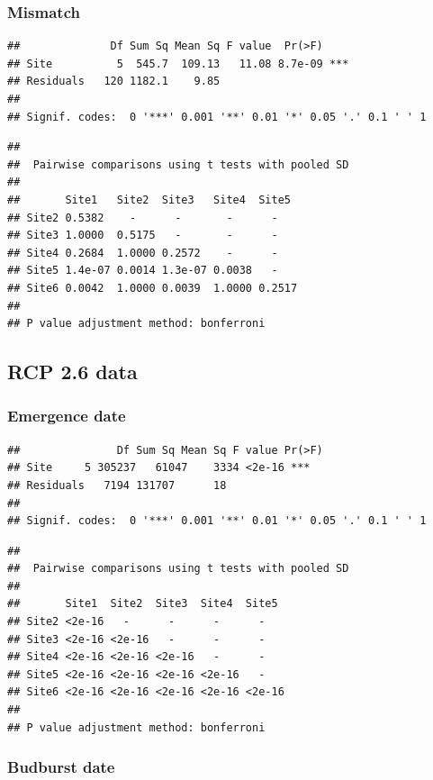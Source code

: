 \documentclass[12 pt]{article}
\begin{document}
\subsubsection*{Mismatch}

\begin{verbatim}
##              Df Sum Sq Mean Sq F value  Pr(>F)    
## Site          5  545.7  109.13   11.08 8.7e-09 ***
## Residuals   120 1182.1    9.85                    
## 
## Signif. codes:  0 '***' 0.001 '**' 0.01 '*' 0.05 '.' 0.1 ' ' 1
\end{verbatim}

\begin{verbatim}
## 
##  Pairwise comparisons using t tests with pooled SD 
## 
##       Site1   Site2  Site3   Site4  Site5 
## Site2 0.5382    -      -       -      -     
## Site3 1.0000  0.5175   -       -      -     
## Site4 0.2684  1.0000 0.2572    -      -     
## Site5 1.4e-07 0.0014 1.3e-07 0.0038   -     
## Site6 0.0042  1.0000 0.0039  1.0000 0.2517
## 
## P value adjustment method: bonferroni
\end{verbatim}

\subsection{RCP 2.6 data}
\subsubsection*{Emergence date}

\begin{verbatim}
##               Df Sum Sq Mean Sq F value Pr(>F)    
## Site     5 305237   61047    3334 <2e-16 ***
## Residuals   7194 131707      18                   
## 
## Signif. codes:  0 '***' 0.001 '**' 0.01 '*' 0.05 '.' 0.1 ' ' 1
\end{verbatim}

\begin{verbatim}
## 
##  Pairwise comparisons using t tests with pooled SD 
##  
##       Site1  Site2  Site3  Site4  Site5 
## Site2 <2e-16   -      -      -      -     
## Site3 <2e-16 <2e-16   -      -      -     
## Site4 <2e-16 <2e-16 <2e-16   -      -     
## Site5 <2e-16 <2e-16 <2e-16 <2e-16   -     
## Site6 <2e-16 <2e-16 <2e-16 <2e-16 <2e-16
## 
## P value adjustment method: bonferroni
\end{verbatim}

\subsubsection*{Budburst date}
\end{document}
